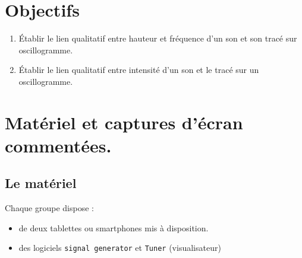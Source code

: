 \documentclass[12pt,a4paper,notitlepage]{article}
\begin{document}
\begin{flushleft}
\begin{tabular}{| m{0.03\linewidth} | m{0.75\linewidth} || m{0.015\linewidth} | m{0.015\linewidth} | m{0.015\linewidth} | m{0.015\linewidth} || }
	\hline
\end{tabular}
\end{flushleft}
\section*{Objectifs}
\begin{enumerate}
	\item Établir le lien qualitatif entre hauteur et fréquence d'un son et son tracé sur oscillogramme. 
	\item Établir le lien qualitatif entre intensité d'un son et le tracé sur un oscillogramme.
\end{enumerate}

\section*{Matériel et captures d'écran commentées.}
\subsection*{Le matériel}
Chaque groupe dispose :
\begin{itemize}
	\item de deux tablettes ou smartphones mis à disposition.
	\item des logiciels \texttt{signal generator} et \texttt{Tuner} (visualisateur)
\end{itemize}
\end{document}
